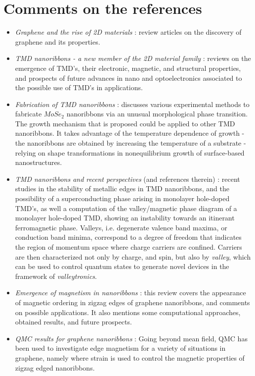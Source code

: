 \documentclass[10pt, twocolumn, twoside]{article}
\begin{document}
\section{Comments on the references}
\begin{itemize}
\item \emph{Graphene and the rise of 2D materials} \cite{graphene, graphene_nobel} : review articles on the discovery of graphene and its properties. 
\item \emph{TMD nanoribbons - a new member of the 2D material family} \cite{tmd_family1, tmd_family2, tmd_family3} : reviews on the emergence of  TMD's, their electronic, magnetic, and structural properties, and prospects of future advances in nano and optoelectronics associated to the possible use of TMD's in applications.
\item \emph{Fabrication of TMD nanoribbons} \cite{chen} : discusses various experimental methods to fabricate $MoSe_2$ nanoribbons via an unusual morphological phase transition. The growth mechanism that is proposed could be applied to other TMD nanoribbons. It takes advantage of the temperature dependence of growth - the nanoribbons are obtained by increasing the temperature of a substrate - relying on shape transformations in nonequilibrium growth of surface-based nanostructures.
\item \emph{TMD nanoribbons and recent perspectives} \cite{nanoribbon,topological, tmd_magnetism} (and references therein) : recent studies in the stability of metallic edges in TMD nanoribbons, and the possibility of a superconducting phase arising in monolayer hole-doped TMD's, as well a computation of the valley/magnetic phase diagram of a monolayer hole-doped TMD, showing an instability towards an itinerant ferromagnetic phase. Valleys, i.e. degenerate valence band maxima, or conduction band minima, correspond to a degree of freedom that indicates the region of momentum space where charge carriers are confined. Carriers are then characterized not only by charge, and spin, but also by \emph{valley}, which can be used to control quantum states to generate novel devices in the framework of \emph{valleytronics}.
\item \emph{Emergence of magnetism in nanoribbons} \cite{yazyev} : this review covers the appearance of magnetic ordering in zigzag edges of graphene nanoribbons, and comments on possible applications. It also mentions some computational approaches, obtained results, and future prospects.
\item \emph{QMC results for graphene nanoribbons} \cite{qmc_results1, qmc_results2, qmc_results3, qmc_results4, qmc_results5} : Going beyond mean field, QMC has been used to investigate edge magnetism for a variety of situations in graphene, namely where strain is used to control the magnetic properties of zigzag edged nanoribbons.

\end{itemize}
\end{document}
